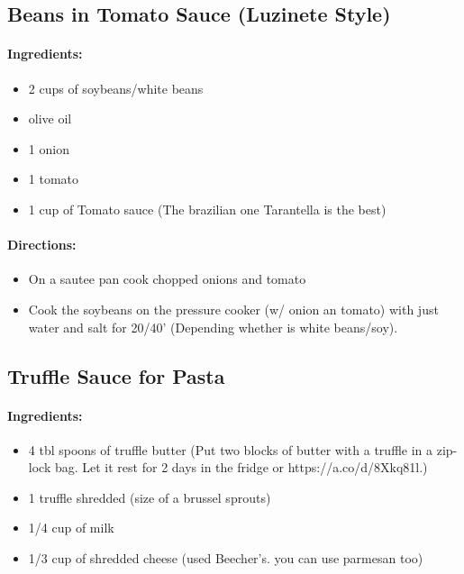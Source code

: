 \documentclass{article}
\begin{document}
\subsection{Beans in Tomato Sauce (Luzinete Style)}

\paragraph{Ingredients:}
\begin{itemize}
    \item 2 cups of soybeans/white beans
    \item olive oil
    \item 1 onion
    \item 1 tomato
    \item 1 cup of Tomato sauce (The brazilian one Tarantella is the best)
\end{itemize}

\paragraph{Directions:}
\begin{itemize}
    \item On a sautee pan cook chopped onions and tomato
    \item Cook the soybeans on the pressure cooker (w/ onion an tomato) with just water and salt for 20/40' (Depending whether is white beans/soy).
\end{itemize}

\subsection{Truffle Sauce for Pasta}

\paragraph{Ingredients:}
\begin{itemize}
    \item 4 tbl spoons of truffle butter (Put two blocks of butter with a truffle in a zip-lock bag. Let it rest for 2 days in the fridge or https://a.co/d/8Xkq81l.)
    \item 1 truffle shredded (size of a brussel sprouts)
    \item 1/4 cup of milk
    \item 1/3 cup of shredded cheese (used Beecher's. you can use parmesan too)
\end{itemize}
\end{document}
